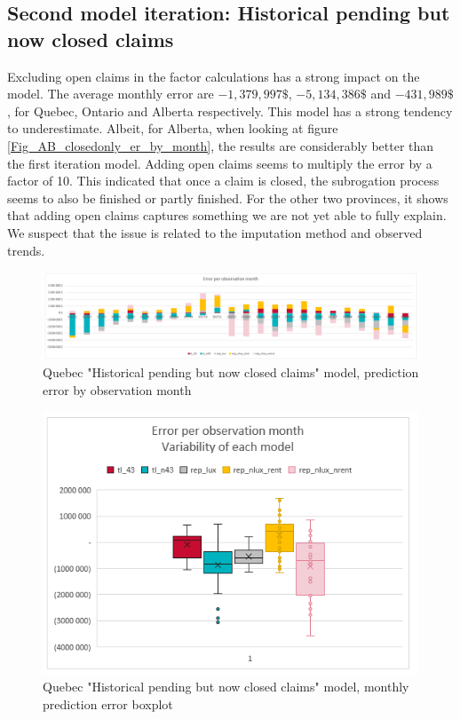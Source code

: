 \subsection{Second model iteration: Historical pending but now closed claims}
	Excluding open claims in the factor calculations has a strong impact on the model. The average monthly error are $-1,379,997 \$ $, $-5,134,386 \$ $ and $-431,989\$ $, for Quebec, Ontario and Alberta respectively. This model has a strong tendency to underestimate. Albeit, for Alberta, when looking at figure \ref{Fig_AB_closedonly_er_by_month}, the results are considerably better than the first iteration model. Adding open claims seems to multiply the error by a factor of 10. This indicated that once a claim is closed, the subrogation process seems to also be finished or partly finished. For the other two provinces, it shows that adding open claims captures something we are not yet able to fully explain. We suspect that the issue is related to the imputation method and observed trends.
		\begin{figure}[H]
			\begin{center}
				\includegraphics[scale=0.4]{Graphiques/QC_closedonly_model_by_month} 
				\renewcommand{\figurename}{Figure}
				\caption{Quebec "Historical  pending but now closed claims" model, prediction error by observation month}\label{Fig_QC_closedonly_er_by_month}
			\end{center}
		\end{figure}
		\begin{figure}[H]
			\begin{center}
				\includegraphics[scale=0.4]{Graphiques/QC_closedonly_model_mustach} 
				\renewcommand{\figurename}{Figure}
				\caption{Quebec "Historical  pending but now closed claims" model, monthly prediction error boxplot}\label{Fig_QC_closedonly_er_boxplot}
			\end{center}
		\end{figure}

